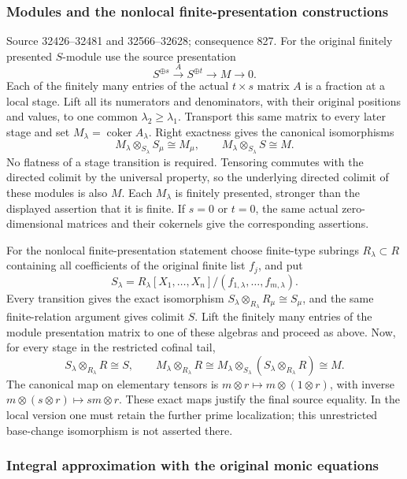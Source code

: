\subsubsection{Modules and the nonlocal finite-presentation constructions}\label{algebra-proof-037-modules-and-the-nonlocal-finite-presentation-constructions}

Source 32426--32481 and 32566--32628; consequence 827. For the original finitely presented \(S\)-module use the source presentation \[
S^{\oplus s}\xrightarrow{A}S^{\oplus t}\longrightarrow M\longrightarrow0.
\] Each of the finitely many entries of the actual \(t\times s\) matrix \(A\) is a fraction at a local stage. Lift all its numerators and denominators, with their original positions and values, to one common \(\lambda_2\ge\lambda_1\). Transport this same matrix to every later stage and set \(M_\lambda=\operatorname{coker}A_\lambda\). Right exactness gives the canonical isomorphisms \[
M_\lambda\otimes_{S_\lambda}S_\mu\cong M_\mu,\qquad
M_\lambda\otimes_{S_\lambda}S\cong M.
\] No flatness of a stage transition is required. Tensoring commutes with the directed colimit by the universal property, so the underlying directed colimit of these modules is also \(M\). Each \(M_\lambda\) is finitely presented, stronger than the displayed assertion that it is finite. If \(s=0\) or \(t=0\), the same actual zero-dimensional matrices and their cokernels give the corresponding assertions.

For the nonlocal finite-presentation statement choose finite-type subrings \(R_\lambda\subset R\) containing all coefficients of the original finite list \(f_j\), and put \[
S_\lambda=R_\lambda[X_1,\ldots,X_n]/(f_{1,\lambda},\ldots,f_{m,\lambda}).
\] Every transition gives the exact isomorphism \(S_\lambda\otimes_{R_\lambda}R_\mu\cong S_\mu\), and the same finite-relation argument gives colimit \(S\). Lift the finitely many entries of the module presentation matrix to one of these algebras and proceed as above. Now, for every stage in the restricted cofinal tail, \[
S_\lambda\otimes_{R_\lambda}R\cong S,\qquad
M_\lambda\otimes_{R_\lambda}R
\cong M_\lambda\otimes_{S_\lambda}(S_\lambda\otimes_{R_\lambda}R)
\cong M.
\] The canonical map on elementary tensors is \(m\otimes r\mapsto m\otimes(1\otimes r)\), with inverse \(m\otimes(s\otimes r)\mapsto sm\otimes r\). These exact maps justify the final source equality. In the local version one must retain the further prime localization; this unrestricted base-change isomorphism is not asserted there.

\subsubsection{Integral approximation with the original monic equations}\label{algebra-proof-037-integral-approximation-with-the-original-monic-equations}

